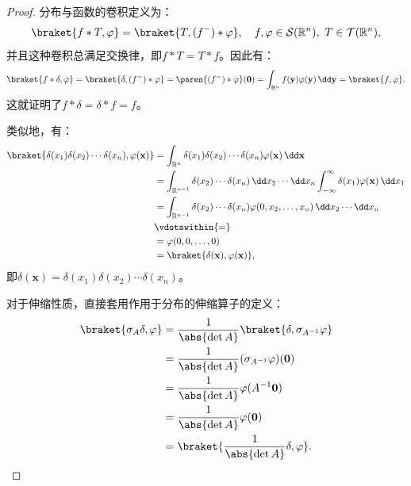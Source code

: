 \begin{proof}
    分布与函数的卷积定义为：
    \begin{equation}
        \braket{f*T,\varphi}=\braket{T,(f^-)*\varphi},\quad f,\varphi\in\mathcal{S}(\mathbb{R}^n),\ T\in\mathcal{T}(\mathbb{R}^n),
    \end{equation}
    并且这种卷积总满足交换律，即$f*T=T*f$。因此有：
    \begin{equation}
        \braket{f*\delta,\varphi}=\braket{\delta,(f^-)*\varphi}=\paren{(f^-)*\varphi}(\mathbf{0})=\int_{\mathbb{R}^n}f(\mathbf{y})\varphi(\mathbf{y})\,\dd\mathbf{y}=\braket{f,\varphi}.
    \end{equation}
    这就证明了$f*\delta=\delta*f=f$。

    类似地，有：
    \begin{align}
        \braket{\delta(x_1)\delta(x_2)\cdots\delta(x_n),\varphi(\mathbf{x})}&=\int_{\mathbb{R}^n}\delta(x_1)\delta(x_2)\cdots\delta(x_n)\varphi(\mathbf{x})\,\dd\mathbf{x}\nonumber\\
        &=\int_{\mathbb{R}^{n-1}}\delta(x_2)\cdots\delta(x_n)\,\dd x_2\cdots\dd x_n\int_{-\infty}^{\infty}\delta(x_1)\varphi(\mathbf{x})\,\dd x_1\nonumber\\
        &=\int_{\mathbb{R}^{n-1}}\delta(x_2)\cdots\delta(x_n)\varphi(0,x_2,\ldots,x_n)\,\dd x_2\cdots\dd x_n\nonumber\\
        &\vdotswithin{=}\nonumber\\
        &=\varphi(0,0,\ldots,0)\nonumber\\
        &=\braket{\delta(\mathbf{x}),\varphi(\mathbf{x})},
    \end{align}
    即$\delta(\mathbf{x})=\delta(x_1)\delta(x_2)\cdots\delta(x_n)$。

    对于伸缩性质，直接套用作用于分布的伸缩算子的定义：
    \begin{align}
        \braket{\sigma_A\delta,\varphi}&=\frac{1}{\abs{\det A}}\braket{\delta,\sigma_{A^{-1}}\varphi}\nonumber\\
        &=\frac{1}{\abs{\det A}}(\sigma_{A^{-1}}\varphi)(\mathbf{0})\nonumber\\
        &=\frac{1}{\abs{\det A}}\varphi(A^{-1}\mathbf{0})\nonumber\\
        &=\frac{1}{\abs{\det A}}\varphi(\mathbf{0})\nonumber\\
        &=\braket{\frac{1}{\abs{\det A}}\delta,\varphi}.
    \end{align}


\end{proof}
